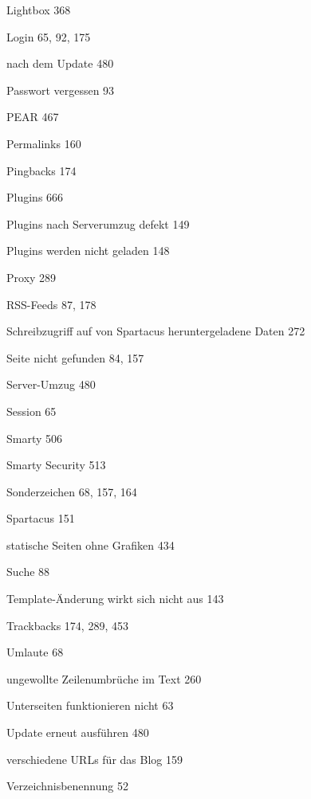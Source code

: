 \documentclass{book}
\renewcommand\subitem{\par}
\begin{document}
\begin{multicols}{2}
\begin{osp-index}
    \subitem Lightbox\hspace{1mm} 368
    \subitem Login\hspace{1mm} 65, 92, 175
    \subitem nach dem Update\hspace{1mm} 480
    \subitem Passwort vergessen\hspace{1mm} 93
    \subitem PEAR\hspace{1mm} 467
    \subitem Permalinks\hspace{1mm} 160
    \subitem Pingbacks\hspace{1mm} 174
    \subitem Plugins\hspace{1mm} 666
    \subitem Plugins nach Serverumzug defekt\hspace{1mm} 149
    \subitem Plugins werden nicht geladen\hspace{1mm} 148
    \subitem Proxy\hspace{1mm} 289
    \subitem RSS-Feeds\hspace{1mm} 87, 178
    \subitem Schreibzugriff auf von Spartacus heruntergeladene Daten\hspace{1mm} 
		272
    \subitem Seite nicht gefunden\hspace{1mm} 84, 157
    \subitem Server-Umzug\hspace{1mm} 480
    \subitem Session\hspace{1mm} 65
    \subitem Smarty\hspace{1mm} 506
    \subitem Smarty Security\hspace{1mm} 513
    \subitem Sonderzeichen\hspace{1mm} 68, 157, 164
    \subitem Spartacus\hspace{1mm} 151
    \subitem statische Seiten ohne Grafiken\hspace{1mm} 434
    \subitem Suche\hspace{1mm} 88
    \subitem Template-\"Anderung wirkt sich nicht aus\hspace{1mm} 143
    \subitem Trackbacks\hspace{1mm} 174, 289, 453
    \subitem Umlaute\hspace{1mm} 68
    \subitem ungewollte Zeilenumbr\"uche im Text\hspace{1mm} 260
    \subitem Unterseiten funktionieren nicht\hspace{1mm} 63
    \subitem Update erneut ausf\"uhren\hspace{1mm} 480
    \subitem verschiedene URLs f\"ur das Blog\hspace{1mm} 159
    \subitem Verzeichnisbenennung\hspace{1mm} 52

\end{osp-index}
\end{multicols}
\end{document}

